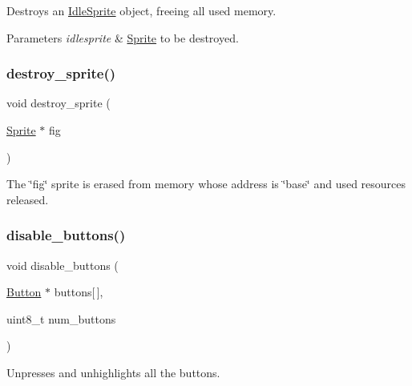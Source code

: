 Destroys an \mbox{\hyperlink{struct_idle_sprite}{Idle\+Sprite}} object, freeing all used memory. 


\begin{DoxyParams}{Parameters}
{\em idlesprite} & \mbox{\hyperlink{struct_sprite}{Sprite}} to be destroyed. \\
\hline
\end{DoxyParams}
\mbox{\label{group__sprite_ga0b9702271420a69a1603d0a3768fda67}} 
\subsubsection{\texorpdfstring{destroy\+\_\+sprite()}{destroy\_sprite()}}
{\footnotesize\ttfamily void destroy\+\_\+sprite (\begin{DoxyParamCaption}\item[{\mbox{\hyperlink{struct_sprite}{Sprite}} $\ast$}]{fig }\end{DoxyParamCaption})}

The \char`\"{}fig\char`\"{} sprite is erased from memory whose address is \char`\"{}base\char`\"{} and used resources released. \mbox{\label{group__sprite_ga7438e498241a820e8b1f4ab63e42c99b}} 
\subsubsection{\texorpdfstring{disable\+\_\+buttons()}{disable\_buttons()}}
{\footnotesize\ttfamily void disable\+\_\+buttons (\begin{DoxyParamCaption}\item[{\mbox{\hyperlink{struct_button}{Button}} $\ast$}]{buttons\mbox{[}$\,$\mbox{]},  }\item[{uint8\+\_\+t}]{num\+\_\+buttons }\end{DoxyParamCaption})}



Unpresses and unhighlights all the buttons. 


